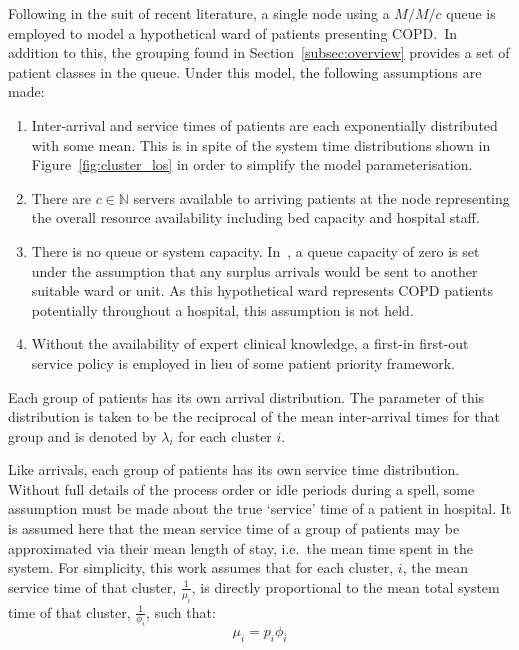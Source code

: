\documentclass[11pt]{article}
\begin{document}
Following in the suit of recent literature, a single node using a \(M/M/c\)
queue is employed to model a hypothetical ward of patients presenting COPD.\ In
addition to this, the grouping found in Section~\ref{subsec:overview} provides
a set of patient classes in the queue. Under this model, the following
assumptions are made:
\begin{enumerate}
    \item Inter-arrival and service times of patients are each exponentially
        distributed with some mean. This is in spite of the system time
        distributions shown in Figure~\ref{fig:cluster_los} in order to
        simplify the model parameterisation.
    \item There are \(c \in \mathbb{N}\) servers available to arriving patients
        at the node representing the overall resource availability including bed
        capacity and hospital staff.
    \item There is no queue or system capacity. In~\cite{Williams2015}, a
        queue capacity of zero is set under the assumption that any surplus
        arrivals would be sent to another suitable ward or unit. As this
        hypothetical ward represents COPD patients potentially throughout a
        hospital, this assumption is not held.
    \item Without the availability of expert clinical knowledge, a first-in
        first-out service policy is employed in lieu of some patient priority 
        framework.
\end{enumerate}

Each group of patients has its own arrival distribution. The parameter of this
distribution is taken to be the reciprocal of the mean inter-arrival times for
that group and is denoted by \(\lambda_i\) for each cluster \(i\).

Like arrivals, each group of patients has its own service time distribution.
Without full details of the process order or idle periods during a spell, some
assumption must be made about the true `service' time of a patient in hospital.
It is assumed here that the mean service time of a group of patients may be
approximated via their mean length of stay, i.e.\ the mean time spent in the
system. For simplicity, this work assumes that for each cluster, \(i\), the mean
service time of that cluster, \(\frac{1}{\mu_i}\), is directly proportional
to the mean total system time of that cluster, \(\frac{1}{\phi_i}\), such that:
\begin{equation}\label{eq:services}
    \mu_i = p_i \phi_i
\end{equation}
\end{document}

